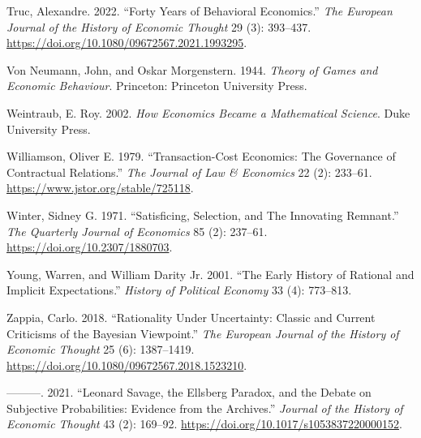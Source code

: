 \documentclass[
]{interact}
\newlength{\cslhangindent}
\newenvironment{CSLReferences}[2] %
 {\begin{list}{}{%
  \setlength{\itemindent}{0pt}
  \setlength{\leftmargin}{0pt}
  \setlength{\parsep}{0pt}
  \ifodd #1
   \setlength{\leftmargin}{\cslhangindent}
   \setlength{\itemindent}{-1\cslhangindent}
  \fi
  \setlength{\itemsep}{#2\baselineskip}}}
 {\end{list}}
\begin{document}
\begin{CSLReferences}{1}{0}
Truc, Alexandre. 2022. {``Forty Years of Behavioral Economics.''}
\emph{The European Journal of the History of Economic Thought} 29 (3):
393--437. \url{https://doi.org/10.1080/09672567.2021.1993295}.

Von Neumann, John, and Oskar Morgenstern. 1944. \emph{Theory of {Games}
and {Economic Behaviour}}. Princeton: Princeton University Press.

Weintraub, E. Roy. 2002. \emph{How {Economics Became} a {Mathematical
Science}}. Duke University Press.

Williamson, Oliver E. 1979. {``Transaction-{Cost Economics}: {The
Governance} of {Contractual Relations}.''} \emph{The Journal of Law \&
Economics} 22 (2): 233--61. \url{https://www.jstor.org/stable/725118}.

Winter, Sidney G. 1971. {``Satisficing, {Selection}, and {The Innovating
Remnant}.''} \emph{The Quarterly Journal of Economics} 85 (2): 237--61.
\url{https://doi.org/10.2307/1880703}.

Young, Warren, and William Darity Jr. 2001. {``The {Early History} of
{Rational} and {Implicit Expectations}.''} \emph{History of Political
Economy} 33 (4): 773--813.

Zappia, Carlo. 2018. {``Rationality Under Uncertainty: Classic and
Current Criticisms of the {Bayesian} Viewpoint.''} \emph{The European
Journal of the History of Economic Thought} 25 (6): 1387--1419.
\url{https://doi.org/10.1080/09672567.2018.1523210}.

---------. 2021. {``Leonard {Savage}, the {Ellsberg Paradox}, and the
{Debate} on {Subjective Probabilities}: {Evidence} from the
{Archives}.''} \emph{Journal of the History of Economic Thought} 43 (2):
169--92. \url{https://doi.org/10.1017/s1053837220000152}.

\end{CSLReferences}
\end{document}
